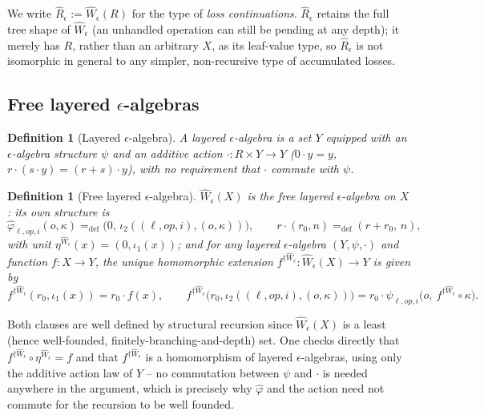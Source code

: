 \documentclass[11pt]{article}
\theoremstyle{plain}
\newtheorem{definition}[theorem]{Definition}
\newcommand{\Wm}[1]{\widehat{W}_{#1}}
\newcommand{\Rm}[1]{\widehat{R}_{#1}}
\newcommand{\eps}{\epsilon}
\newcommand{\dg}[1]{^{\dagger #1}}
\newcommand{\op}{\mathit{op}}
\begin{document}
We write $\Rm\eps := \Wm\eps(R)$ for the type of \emph{loss continuations}. $\Rm\eps$
retains the full tree shape of $\Wm\eps$ (an unhandled operation can still be pending at
any depth); it merely has $R$, rather than an arbitrary $X$, as its leaf-value type, so
$\Rm\eps$ is not isomorphic in general to any simpler, non-recursive type of accumulated
losses.

\subsection{Free layered $\eps$-algebras}

\begin{definition}[Layered $\eps$-algebra]
A \emph{layered $\eps$-algebra} is a set $Y$ equipped with an $\eps$-algebra structure $\psi$
and an additive action $\cdot: R\times Y \to Y$ ($0\cdot y = y$, $r\cdot(s\cdot y)=(r+s)\cdot y$), with \emph{no} requirement that $\cdot$
commute with $\psi$.
\end{definition}

\begin{definition}[Free layered $\eps$-algebra]
$\Wm\eps(X)$ is the free layered $\eps$-algebra on $X$: its own structure is
\[
  \widehat\varphi_{\ell,\op,i}(o,\kappa) =_{\mathrm{def}} \big(0,\, \iota_2((\ell,\op,i),(o,\kappa))\big),
  \qquad
  r\cdot(r_0,n) =_{\mathrm{def}} (r+r_0,\,n),
\]
with unit $\eta^{\Wm\eps}(x) = (0,\iota_1(x))$; and for any layered $\eps$-algebra
$(Y,\psi,\cdot)$ and function $f:X\to Y$, the unique homomorphic extension
$f\dg{\Wm\eps}: \Wm\eps(X)\to Y$ is given by
\[
  f\dg{\Wm\eps}(r_0,\iota_1(x)) = r_0\cdot f(x),
  \qquad
  f\dg{\Wm\eps}\big(r_0,\iota_2((\ell,\op,i),(o,\kappa))\big)
     = r_0\cdot \psi_{\ell,\op,i}\big(o,\ f\dg{\Wm\eps}\circ\kappa\big).
\]
\end{definition}

Both clauses are well defined by structural recursion since $\Wm\eps(X)$ is a least
(hence well-founded, finitely-branching-and-depth) set. One checks directly that
$f\dg{\Wm\eps}\circ\eta^{\Wm\eps} = f$ and that $f\dg{\Wm\eps}$ is a
homomorphism of layered $\eps$-algebras, using only the additive action law of $Y$ -- no
commutation between $\psi$ and $\cdot$ is needed anywhere in the argument, which is precisely
why $\widehat\varphi$ and the action need not commute for the recursion to be well founded.
\end{document}
